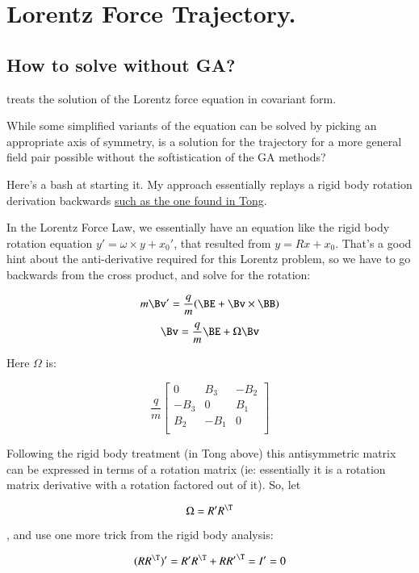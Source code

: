 \chapter{Lorentz Force Trajectory.}
\label{chap:lorentzRotation}
\date{ May 7, 2008.  $RCSfile: lorentzRotation.tex,v $ Last $Revision: 1.9 $ $Date: 2009/06/14 17:59:59 $ }

\section{How to solve without GA? }

\cite{doran2003gap} treats the solution of the Lorentz force equation
in covariant form.

While some simplified variants of the equation can be solved by 
picking an appropriate axis of symmetry, is a solution 
for the trajectory 
for a more general field pair possible without the softistication 
of the GA methods?

Here's a bash at starting it.  My approach essentially replays a
rigid body rotation derivation backwards
\href{http://www.damtp.cam.ac.uk/user/tong/dynamics/three.pdf}{such as the one found in Tong}.

In the Lorentz Force Law, we essentially have an equation like the rigid body rotation equation $y' = \omega \times y + x_0'$, that resulted from $y = R x + x_0$.  That's a good hint about the anti-derivative required for this Lorentz problem, so we have to go backwards from the cross product, and solve for the rotation:
 
\[
m \Bv' = \frac{q}{m} ( \BE + \Bv \times \BB )
\]
\[
\Bv = \frac{q}{m} \BE + \Omega \Bv
\]

Here $\Omega$ is:

\[
\frac{q}{m}
\begin{bmatrix}
0 & B_3 & -B_2 \\
-B_3 & 0 & B_1 \\
B_2 & -B_1 & 0 \\
\end{bmatrix}
\]

Following the rigid body treatment (in Tong above) this antisymmetric matrix can be expressed in terms of a rotation matrix (ie: essentially it is a rotation matrix derivative with a rotation factored out of it).  So, let

\[
\Omega = R' R^\T
\]

, and use one more trick from the rigid body analysis:

\[
(RR^\T)' = R' R^\T + R {R'}^\T = I' = 0
\]

